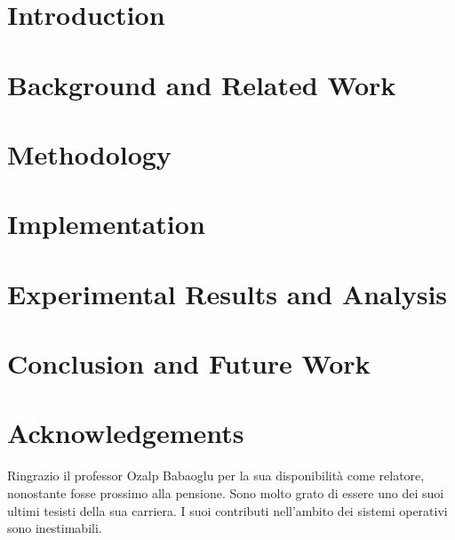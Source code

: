 \documentclass[12pt,a4paper,openright,twoside]{report}
\begin{document}
\chapter{Introduction}
\lhead[\fancyplain{}{\bfseries\thepage}]{\fancyplain{}{\bfseries\rightmark}}


\chapter{Background and Related Work}
\lhead[\fancyplain{}{\bfseries\thepage}]{\fancyplain{}{\bfseries\rightmark}}


\chapter{Methodology}
\lhead[\fancyplain{}{\bfseries\thepage}]{\fancyplain{}{\bfseries\rightmark}}


\chapter{Implementation}
\lhead[\fancyplain{}{\bfseries\thepage}]{\fancyplain{}{\bfseries\rightmark}}


\chapter{Experimental Results and Analysis}
\lhead[\fancyplain{}{\bfseries\thepage}]{\fancyplain{}{\bfseries\rightmark}}


\chapter{Conclusion and Future Work}
\lhead[\fancyplain{}{\bfseries\thepage}]{\fancyplain{}{\bfseries\rightmark}}




\chapter*{Acknowledgements}
Ringrazio il professor Ozalp Babaoglu per la sua disponibilità come relatore, nonostante fosse prossimo alla pensione. 
Sono molto grato di essere uno dei suoi ultimi tesisti della sua carriera. I suoi contributi nell'ambito dei sistemi operativi sono inestimabili.  
\end{document}
